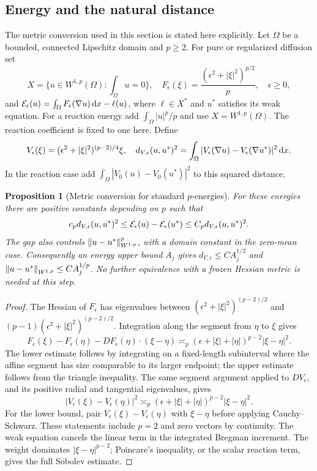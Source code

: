 \documentclass[11pt]{article}
\newtheorem{proposition}[theorem]{Proposition}
\theoremstyle{remark}
\begin{document}
\subsection{Energy and the natural distance}
\label{sec:c5-natural}

The metric conversion used in this section is stated here explicitly.
Let $\Omega$ be a bounded, connected Lipschitz domain and $p\geq2$.
For pure or regularized diffusion set
\[
 X=\{u\in W^{1,p}(\Omega):\textstyle\int_\Omega u=0\},\quad
 F_\epsilon(\xi)=\frac{(\epsilon^2+|\xi|^2)^{p/2}}p,\quad \epsilon\geq0,
\]
and $\mathcal E_\epsilon(u)=\int_\Omega F_\epsilon(\nabla u)\,\mathrm d x-\ell(u)$,
where $\ell\in X^*$ and $u^*$ satisfies its weak equation.
For a reaction energy add $\int_\Omega |u|^p/p$ and use
$X=W^{1,p}(\Omega)$. The reaction coefficient is fixed to one here.
Define
\[
 V_\epsilon(\xi)=(\epsilon^2+|\xi|^2)^{(p-2)/4}\xi,\quad
 d_{V,\epsilon}(u,u^*)^2=
 \int_\Omega|V_\epsilon(\nabla u)-V_\epsilon(\nabla u^*)|^2\,\mathrm d x .
\]
In the reaction case add
$\int_\Omega|V_0(u)-V_0(u^*)|^2$ to this squared distance.

\begin{proposition}[Metric conversion for standard $p$-energies]
\label{prop:c5-natural}
For these energies there are positive constants depending on $p$ such that
\begin{equation}
 c_p d_{V,\epsilon}(u,u^*)^2
 \leq\mathcal E_\epsilon(u)-\mathcal E_\epsilon(u^*)
 \leq C_p d_{V,\epsilon}(u,u^*)^2 .
 \label{eq:c5-natural}
\end{equation}
The gap also controls $\left\lVert u-u^*\right\rVert_{W^{1,p}}^p$, with a domain
constant in the zero-mean case. Consequently an energy upper bound
$A_j$ gives $d_{V,\epsilon}\leq C A_j^{1/2}$ and
$\left\lVert u-u^*\right\rVert_{W^{1,p}}\leq C A_j^{1/p}$.
No further equivalence with a frozen Hessian metric is needed at this step.
\end{proposition}
\begin{proof}
The Hessian of $F_\epsilon$ has eigenvalues between
$(\epsilon^2+|\xi|^2)^{(p-2)/2}$ and
$(p-1)(\epsilon^2+|\xi|^2)^{(p-2)/2}$.
Integration along the segment from $\eta$ to $\xi$ gives
\[
 F_\epsilon(\xi)-F_\epsilon(\eta)-DF_\epsilon(\eta)\cdot(\xi-\eta)
 \asymp_p(\epsilon+|\xi|+|\eta|)^{p-2}|\xi-\eta|^2 .
\]
The lower estimate follows by integrating on a fixed-length subinterval
where the affine segment has size comparable to its larger endpoint;
the upper estimate follows from the triangle inequality.
The same segment argument applied to $DV_\epsilon$, and its positive
radial and tangential eigenvalues, gives
\[
 |V_\epsilon(\xi)-V_\epsilon(\eta)|^2
 \asymp_p(\epsilon+|\xi|+|\eta|)^{p-2}|\xi-\eta|^2 .
\]
For the lower bound, pair $V_\epsilon(\xi)-V_\epsilon(\eta)$ with
$\xi-\eta$ before applying Cauchy--Schwarz.
These statements include $p=2$ and zero vectors by continuity.
The weak equation cancels the linear term in the integrated Bregman
increment. The weight dominates $|\xi-\eta|^{p-2}$; Poincare's inequality,
or the scalar reaction term, gives the full Sobolev estimate.
\end{proof}
\end{document}
